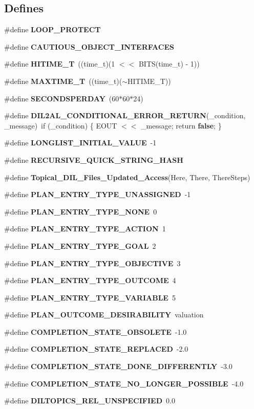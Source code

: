 \subsection*{Defines}
\begin{CompactItemize}
\item 
\#define {\bf LOOP\_\-PROTECT}
\item 
\#define {\bf CAUTIOUS\_\-OBJECT\_\-INTERFACES}
\item 
\#define {\bf HITIME\_\-T}\ ((time\_\-t)(1 $<$$<$ BITS(time\_\-t) - 1))
\item 
\#define {\bf MAXTIME\_\-T}\ ((time\_\-t)($\sim$HITIME\_\-T))
\item 
\#define {\bf SECONDSPERDAY}\ (60$\ast$60$\ast$24)
\item 
\#define {\bf DIL2AL\_\-CONDITIONAL\_\-ERROR\_\-RETURN}(\_\-condition, \_\-message)\ if (\_\-condition) \{ EOUT $<$$<$ \_\-message; return {\bf false}; \}
\item 
\#define {\bf LONGLIST\_\-INITIAL\_\-VALUE}\ -1
\item 
\#define {\bf RECURSIVE\_\-QUICK\_\-STRING\_\-HASH}
\item 
\#define {\bf Topical\_\-DIL\_\-Files\_\-Updated\_\-Access}(Here, There, There\-Steps)
\item 
\#define {\bf PLAN\_\-ENTRY\_\-TYPE\_\-UNASSIGNED}\ -1
\item 
\#define {\bf PLAN\_\-ENTRY\_\-TYPE\_\-NONE}\ 0
\item 
\#define {\bf PLAN\_\-ENTRY\_\-TYPE\_\-ACTION}\ 1
\item 
\#define {\bf PLAN\_\-ENTRY\_\-TYPE\_\-GOAL}\ 2
\item 
\#define {\bf PLAN\_\-ENTRY\_\-TYPE\_\-OBJECTIVE}\ 3
\item 
\#define {\bf PLAN\_\-ENTRY\_\-TYPE\_\-OUTCOME}\ 4
\item 
\#define {\bf PLAN\_\-ENTRY\_\-TYPE\_\-VARIABLE}\ 5
\item 
\#define {\bf PLAN\_\-OUTCOME\_\-DESIRABILITY}\ valuation
\item 
\#define {\bf COMPLETION\_\-STATE\_\-OBSOLETE}\ -1.0
\item 
\#define {\bf COMPLETION\_\-STATE\_\-REPLACED}\ -2.0
\item 
\#define {\bf COMPLETION\_\-STATE\_\-DONE\_\-DIFFERENTLY}\ -3.0
\item 
\#define {\bf COMPLETION\_\-STATE\_\-NO\_\-LONGER\_\-POSSIBLE}\ -4.0
\item 
\#define {\bf DILTOPICS\_\-REL\_\-UNSPECIFIED}\ 0.0
\item 

\end{CompactItemize}
